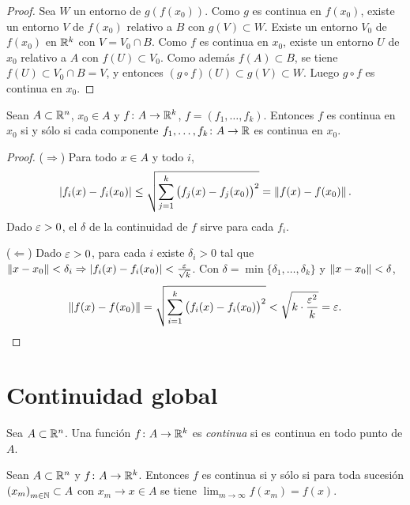 \begin{proof}
  Sea \(W\) un entorno de \(g(f(x_0))\). Como \(g\) es continua en \(f(x_0)\), existe un entorno \(V\) de \(f(x_0)\) relativo a \(B\) con \(g(V) \subset W\). Existe un entorno \(V_0\) de \(f(x_0)\) en \(\mathbb{R}^k\) con \(V = V_0 \cap B\). Como \(f\) es continua en \(x_0\), existe un entorno \(U\) de \(x_0\) relativo a \(A\) con \(f(U) \subset V_0\). Como además \(f(A) \subset B\), se tiene \(f(U) \subset V_0 \cap B = V\), y entonces \((g \circ f)(U) \subset g(V) \subset W\). Luego \(g \circ f\) es continua en \(x_0\).
\end{proof}

\begin{prop}
  Sean \(A \subset \mathbb{R}^n\), \(x_0 \in A\) y \(f\colon A \to \mathbb{R}^k\), \(f = (f_1, \dots, f_k)\). Entonces \(f\) es continua en \(x_0\) si y sólo si cada componente \(f_1, \dots, f_k\colon A \to \mathbb{R}\) es continua en \(x_0\).
\end{prop}

\begin{proof}
  (\(\Rightarrow\)) Para todo \(x \in A\) y todo \(i\),
  \[
    |f_i(x) - f_i(x_0)| \leq \sqrt{\sum_{j=1}^{k} {\bigl( f_j(x) - f_j(x_0) \bigr)}^2} = \left\lVert f(x) - f(x_0) \right\rVert.
  \]
  Dado \(\varepsilon > 0\), el \(\delta\) de la continuidad de \(f\) sirve para cada \(f_i\).

  (\(\Leftarrow\)) Dado \(\varepsilon > 0\), para cada \(i\) existe \(\delta_i > 0\) tal que \(\left\lVert x - x_0 \right\rVert < \delta_i \Rightarrow |f_i(x) - f_i(x_0)| < \frac{\varepsilon}{\sqrt{k}}\). Con \(\delta = \min\{\delta_1, \dots, \delta_k\}\) y \(\left\lVert x - x_0 \right\rVert < \delta\),
  \[
    \left\lVert f(x) - f(x_0) \right\rVert = \sqrt{\sum_{i=1}^{k} {\bigl( f_i(x) - f_i(x_0) \bigr)}^2} < \sqrt{k \cdot \frac{\varepsilon^2}{k}} = \varepsilon. \qedhere
  \]
\end{proof}

\section{Continuidad global}

\begin{definition}
  Sea \(A \subset \mathbb{R}^n\). Una función \(f\colon A \to \mathbb{R}^k\) es \emph{continua} si es continua en todo punto de \(A\).
\end{definition}

\begin{prop}
  Sean \(A \subset \mathbb{R}^n\) y \(f\colon A \to \mathbb{R}^k\). Entonces \(f\) es continua si y sólo si para toda sucesión \({(x_m)}_{m \in \mathbb{N}} \subset A\) con \(x_m \to x \in A\) se tiene \(\lim_{m \to \infty} f(x_m) = f(x)\).
\end{prop}

